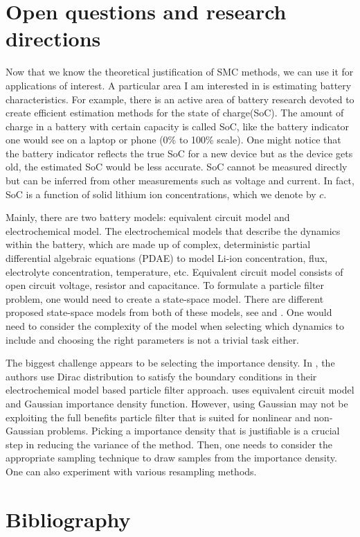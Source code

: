 \documentclass[10pt]{article}
\theoremstyle{definition}
\numberwithin{equation}{section}
\begin{document}
%
\section{Open questions and research directions}

Now that we know the theoretical justification of SMC methods, we can use it for applications of interest. A particular area I am interested in is estimating battery characteristics. For example, there is an active area of battery research devoted to create efficient estimation methods for the state of charge(SoC). The amount of charge in a battery with certain capacity is called SoC, like the battery indicator one would see on a laptop or phone (0\% to 100\% scale). One might notice that the battery indicator reflects the true SoC for a new device but as the device gets old, the estimated SoC would be less accurate. SoC cannot be measured directly but can be inferred from other measurements such as voltage and current. In fact, SoC is a function of solid lithium ion concentrations, which we denote by $c$.

Mainly, there are two battery models: equivalent circuit model and electrochemical model. The electrochemical models that describe the dynamics within the battery, which are made up of complex, deterministic partial differential algebraic equations (PDAE) to model Li-ion concentration, flux, electrolyte concentration, temperature, etc. Equivalent circuit model consists of open circuit voltage, resistor and capacitance. To formulate a particle filter problem, one would need to create a state-space model. There are different proposed state-space models from both of these models, see \cite{he2011evaluation} and \cite{tulsyan2016state}. One would need to consider the complexity of the model when selecting which dynamics to include and choosing the right parameters is not a trivial task either. 

The biggest challenge appears to be selecting the importance density. In \cite{tulsyan2016state}, the authors use Dirac distribution to satisfy the boundary conditions in their electrochemical model based particle filter approach. \cite{miao2013remaining} uses equivalent circuit model and Gaussian importance density function. However, using Gaussian may not be exploiting the full benefits particle filter that is suited for nonlinear and non-Gaussian problems. Picking a importance density that is justifiable is a crucial step in reducing the variance of the method. Then, one needs to consider the appropriate sampling technique to draw samples from the importance density. One can also experiment with various resampling methods. 

\clearpage
\appendix





\section{Bibliography}
\printbibliography
\end{document}
